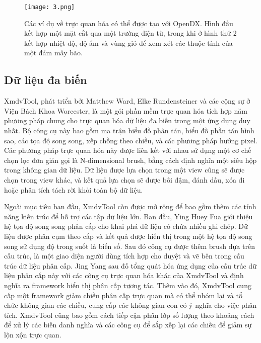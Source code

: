 \documentclass[13pt]{scrartcl} %
\begin{document}
\begin{figure}[!ht] %
    \centering
    \texttt{[image: 3.png]}
    \caption{Các ví dụ về trực quan hóa có thể được tạo với OpenDX. Hình đầu kết hợp một mặt cắt qua một trường điện từ, trong khi ở hình thứ 2 kết hợp nhiệt độ, độ ẩm và vùng gió để xem xét các thuộc tính của một đám mây bão.}
\end{figure}

\newpage
\subsection{Dữ liệu đa biến}

XmdvTool, phát triển bởi Matthew Ward, Elke Rundensteiner và các cộng sự ở Viện Bách Khoa Worcester, là một gói phần mềm trực quan hóa tích hợp năm phương pháp chung cho trực quan hóa dữ liệu đa biến trong một ứng dụng duy nhất. Bộ công cụ này bao gồm ma trận biểu đồ phân tán, biểu đồ phần tán hình sao, các tọa độ song song, xếp chồng theo chiều, và các phương pháp hướng pixel. Các phương pháp trực quan hóa này được liên kết với nhau sử dụng một cơ chế chọn lọc đơn giản gọi là N-dimensional brush, bằng cách định nghĩa một siêu hộp trong không gian dữ liệu. Dữ liệu được lựa chọn trong một view cũng sẽ được chọn trong view khác, và kết quả lựa chọn sẽ được bôi đậm, đánh dấu, xóa đi hoặc phân tích tách rời khỏi toàn bộ dữ liệu.

Ngoài mục tiêu ban đầu, XmdvTool còn được mở rộng để bao gồm thêm các tính năng kiến trúc để hỗ trợ các tập dữ liệu lớn. Ban đầu, Ying Huey Fua giới thiệu hệ tọa độ song song phân cấp cho khai phá dữ liệu có chứa nhiều ghi chép. Dữ liệu được phân cụm theo cấp và kết quả được hiển thị trong một hệ tọa độ song song sử dụng độ trong suốt là biến số. Sau đó công cụ được thêm brush dựa trên cấu trúc, là một giao diện người dùng tích hợp cho duyệt và vẽ bên trong cấu trúc dữ liệu phân cấp. Jing Yang sau đố tổng quát hóa ứng dụng của cấu trúc dữ liệu phân cấp này với các công cụ trực quan hóa khác của XmdvTool và định nghĩa ra framework hiển thị phân cấp tương tác. Thêm vào đó, XmdvTool cung cấp một framework giảm chiều phân cấp trực quan mà có thể nhóm lại và tổ chức không gian các chiều, cung cấp các không gian con có ý nghĩa cho việc phân tích. XmdvTool cũng bao gồm cách tiếp cận phân lớp số lượng theo khoảng cách để xử lý các biến danh nghĩa và các công cụ để sắp xếp lại các chiều để giảm sự lộn xộn trực quan.
\end{document}
